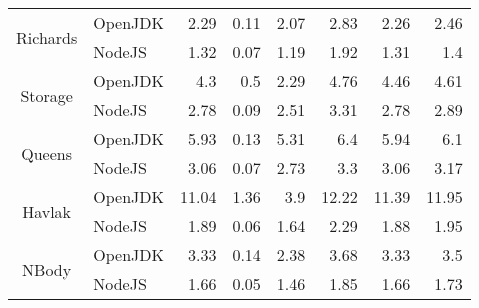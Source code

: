 \begin{center}
\begin{tabular}{ c | l r r r r r r}
\multirow{2}{*}{ Richards } & OpenJDK & 2.29 & 0.11 & 2.07 & 2.83 & 2.26 & 2.46 \\
& NodeJS & 1.32 & 0.07 & 1.19 & 1.92 & 1.31 & 1.4 \\
\midrule

\multirow{2}{*}{ Storage } & OpenJDK & 4.3 & 0.5 & 2.29 & 4.76 & 4.46 & 4.61 \\
& NodeJS & 2.78 & 0.09 & 2.51 & 3.31 & 2.78 & 2.89 \\
\midrule

\multirow{2}{*}{ Queens } & OpenJDK & 5.93 & 0.13 & 5.31 & 6.4 & 5.94 & 6.1 \\
& NodeJS & 3.06 & 0.07 & 2.73 & 3.3 & 3.06 & 3.17 \\
\midrule

\multirow{2}{*}{ Havlak } & OpenJDK & 11.04 & 1.36 & 3.9 & 12.22 & 11.39 & 11.95 \\
& NodeJS & 1.89 & 0.06 & 1.64 & 2.29 & 1.88 & 1.95 \\
\midrule

\multirow{2}{*}{ NBody } & OpenJDK & 3.33 & 0.14 & 2.38 & 3.68 & 3.33 & 3.5 \\
& NodeJS & 1.66 & 0.05 & 1.46 & 1.85 & 1.66 & 1.73 \\
\midrule

\end{tabular}
\end{center}